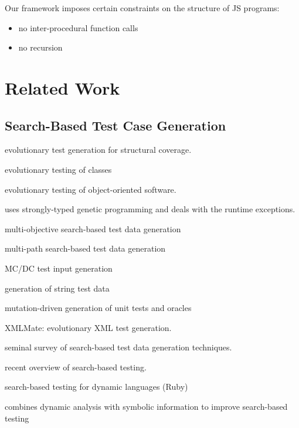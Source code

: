 \documentclass[sigconf]{acmart}
\begin{document}
Our framework imposes certain constraints on the structure of JS programs:
\begin{itemize}
\item no inter-procedural function calls
\item no recursion  
\end{itemize}


\section{Related Work}
\label{sec:related.work}

\subsection{Search-Based Test Case Generation}
\label{sub.sec.search.based}

\cite{wegener2001evolutionary} evolutionary test generation for structural coverage.

\cite{tonella2004evolutionary} evolutionary testing of classes

\cite{wappler2005using} evolutionary testing of object-oriented software.

\cite{wappler2006evolutionary} uses strongly-typed genetic programming and deals with the runtime exceptions.

\cite{lakhotia2007multi} multi-objective search-based test data generation 

\cite{cao2009search} multi-path search-based test data generation

\cite{awedikian2009mc} MC/DC test input generation 

\cite{shahbazi2016black} generation of string test data

\cite{fraser2012mutation} mutation-driven generation of unit tests and oracles

\cite{havrikov2014xmlmate} XMLMate: evolutionary XML test generation.

\cite{mcminn2004search} seminal survey of search-based test data generation techniques.

\cite{mcminn2011search} recent overview of search-based testing.

\cite{mairhofer2011search} search-based testing for dynamic languages (Ruby)

\cite{baars2011symbolic} combines dynamic analysis with symbolic information to improve search-based testing
\end{document}
